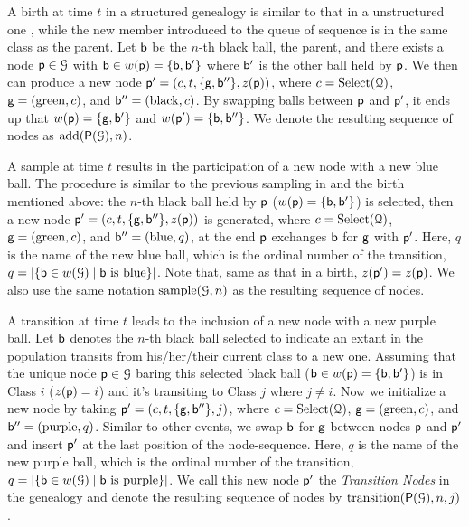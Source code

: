 \documentclass[11pt,reqno,final]{amsart}\usepackage[]{graphicx}\usepackage[]{color}
\begin{document}
A birth at time $t$ in a structured genealogy is similar to that in a unstructured one \citep{King2021}, while the new member introduced to the queue of sequence is in the same class as the parent. Let $\mathsf{b}$ be the $n$-th black ball, the parent, and there exists a node $\mathsf{p}\in\mathcal{G}$ with $\mathsf{b}\in w(\mathsf{p})=\{\mathsf{b},\mathsf{b}'\}$ where $\mathsf{b}'$ is the other ball held by $\mathsf{p}$. We then can produce a new node $\mathsf{p}'=(c,t,\{\mathsf{g},\mathsf{b}''\},z(\mathsf{p}))$, where $c=\mathrm{Select}(\mathcal{Q})$, $\mathsf{g}=(\mathrm{green},c)$, and $\mathsf{b}''=(\mathrm{black},c)$. By swapping balls between $\mathsf{p}$ and $\mathsf{p}'$, it ends up that $w(\mathsf{p})=\{\mathsf{g},\mathsf{b}'\}$ and $w(\mathsf{p}')=\{\mathsf{b},\mathsf{b}''\}$. We denote the resulting sequence of nodes as $\mathrm{add}(\mathsf{P}({\mathcal{G}}),n)$.

A sample at time $t$ results in the participation of a new node with a new blue ball. The procedure is similar to the previous sampling in \citet{King2021} and the birth mentioned above: the $n$-th black ball held by $\mathsf{p}$ (\ie $w(\mathsf{p})=\{\mathsf{b},\mathsf{b}'\}$) is selected, then a new node $\mathsf{p}'=(c,t,\{\mathsf{g},\mathsf{b}''\},z(\mathsf{p}))$ is generated, where $c=\mathrm{Select}(\mathcal{Q})$, $\mathsf{g}=(\mathrm{green},c)$, and $\mathsf{b}''=(\mathrm{blue},q)$, at the end $\mathsf{p}$ exchanges $\mathsf{b}$ for $\mathsf{g}$ with $\mathsf{p}'$. Here, $q$ is the name of the new blue ball, which is the ordinal number of the transition, $q=|\{\mathsf{b}\in w(\mathcal{G})\;|\;\mathsf{b}\ \text{is blue}\}|$. Note that, same as that in a birth, $z(\mathsf{p}')=z(\mathsf{p})$. We also use the same notation $\mathrm{sample}(\mathcal{G},n)$ as the resulting sequence of nodes.

A transition at time $t$ leads to the inclusion of a new node with a new purple ball. Let $\mathsf{b}$ denotes the $n$-th black ball selected to indicate an extant in the population transits from his/her/their current class to a new one. Assuming that the unique node $\mathsf{p}\in\mathcal{G}$ baring this selected black ball (\ie $\mathsf{b}\in w(\mathsf{p})=\{\mathsf{b},\mathsf{b}'\}$) is in Class $i$ (\ie $z(\mathsf{p})=i$) and it's transiting to Class $j$ where $j\neq i$. Now we initialize a new node by taking $\mathsf{p}'=(c,t,\{\mathsf{g},\mathsf{b}''\},j)$, where $c=\mathrm{Select}(\mathcal{Q})$, $\mathsf{g}=(\mathrm{green},c)$, and $\mathsf{b}''=(\mathrm{purple},q)$. Similar to other events, we swap $\mathsf{b}$ for $\mathsf{g}$ between nodes $\mathsf{p}$ and $\mathsf{p}'$ and insert $\mathsf{p}'$ at the last position of the node-sequence. Here, $q$ is the name of the new purple ball, which is the ordinal number of the transition, $q=|\{\mathsf{b}\in w(\mathcal{G})\;|\;\mathsf{b}\ \text{is purple}\}|$. We call this new node $\mathsf{p}'$ the \emph{Transition Nodes} in the genealogy and denote the resulting sequence of nodes by $\mathrm{transition}(\mathsf{P}({\mathcal{G}}),n,j)$.
\end{document}
